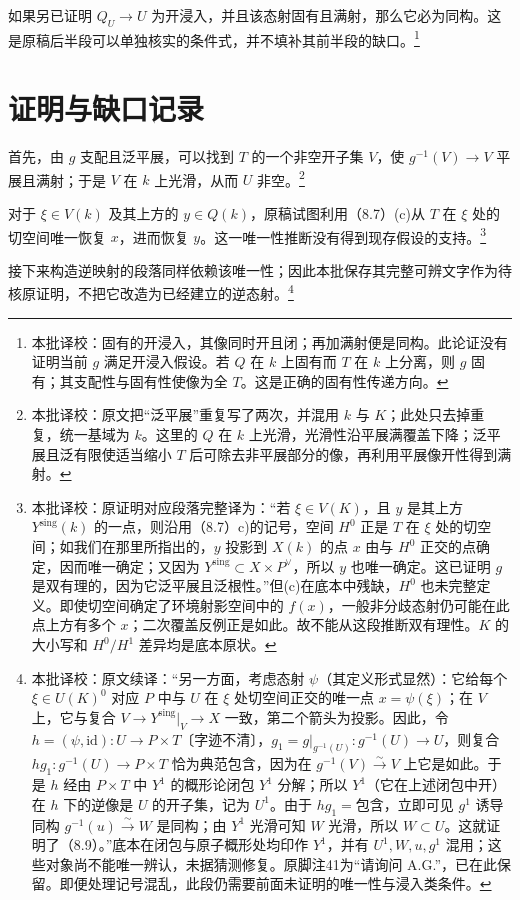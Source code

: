 \documentclass{ctexbook}
\newcommand{\corr}[1]{\footnote{本批译校：#1}}
\newcommand{\Ys}{Y^{\mathrm{sing}}}
\begin{document}
如果另已证明 $Q_U\to U$ 为开浸入，并且该态射固有且满射，那么它必为同构。这是原稿后半段可以单独核实的条件式，并不填补其前半段的缺口。\corr{固有的开浸入，其像同时开且闭；再加满射便是同构。此论证没有证明当前 $g$ 满足开浸入假设。若 $Q$ 在 $k$ 上固有而 $T$ 在 $k$ 上分离，则 $g$ 固有；其支配性与固有性使像为全 $T$。这是正确的固有性传递方向。}

\section*{证明与缺口记录}
首先，由 $g$ 支配且泛平展，可以找到 $T$ 的一个非空开子集 $V$，使 $g^{-1}(V)\to V$ 平展且满射；于是 $V$ 在 $k$ 上光滑，从而 $U$ 非空。\corr{原文把“泛平展”重复写了两次，并混用 $k$ 与 $K$；此处只去掉重复，统一基域为 $k$。这里的 $Q$ 在 $k$ 上光滑，光滑性沿平展满覆盖下降；泛平展且泛有限使适当缩小 $T$ 后可除去非平展部分的像，再利用平展像开性得到满射。}

对于 $\xi\in V(k)$ 及其上方的 $y\in Q(k)$，原稿试图利用（8.7）(c)从 $T$ 在 $\xi$ 处的切空间唯一恢复 $x$，进而恢复 $y$。这一唯一性推断没有得到现存假设的支持。\corr{原证明对应段落完整译为：“若 $\xi\in V(K)$，且 $y$ 是其上方 $\Ys(k)$ 的一点，则沿用（8.7）c)的记号，空间 $H^0$ 正是 $T$ 在 $\xi$ 处的切空间；如我们在那里所指出的，$y$ 投影到 $X(k)$ 的点 $x$ 由与 $H^0$ 正交的点确定，因而唯一确定；又因为 $\Ys\subset X\times P^\vee$，所以 $y$ 也唯一确定。这已证明 $g$ 是双有理的，因为它泛平展且泛根性。”但(c)在底本中残缺，$H^0$ 也未完整定义。即使切空间确定了环境射影空间中的 $f(x)$，一般非分歧态射仍可能在此点上方有多个 $x$；二次覆盖反例正是如此。故不能从这段推断双有理性。$K$ 的大小写和 $H^0/H^1$ 差异均是底本原状。}

接下来构造逆映射的段落同样依赖该唯一性；因此本批保存其完整可辨文字作为待核原证明，不把它改造为已经建立的逆态射。\corr{原文续译：“另一方面，考虑态射 $\psi$（其定义形式显然）：它给每个 $\xi\in U(K)^0$ 对应 $P$ 中与 $U$ 在 $\xi$ 处切空间正交的唯一点 $x=\psi(\xi)$；在 $V$ 上，它与复合 $V\to\Ys|_V\to X$ 一致，第二个箭头为投影。因此，令 $h=(\psi,\mathrm{id}):U\to P\times T$〔字迹不清〕，$g_1=g|_{g^{-1}(U)}:g^{-1}(U)\to U$，则复合 $hg_1:g^{-1}(U)\to P\times T$ 恰为典范包含，因为在 $g^{-1}(V)\xrightarrow{\sim}V$ 上它是如此。于是 $h$ 经由 $P\times T$ 中 $Y^1$ 的概形论闭包 $Y^1$ 分解；所以 $Y^1$（它在上述闭包中开）在 $h$ 下的逆像是 $U$ 的开子集，记为 $U^1$。由于 $hg_1=\text{包含}$，立即可见 $g^1$ 诱导同构 $g^{-1}(u)\xrightarrow{\sim}W$ 是同构；由 $Y^1$ 光滑可知 $W$ 光滑，所以 $W\subset U$。这就证明了（8.9）。”底本在闭包与原子概形处均印作 $Y^1$，并有 $U^1,W,u,g^1$ 混用；这些对象尚不能唯一辨认，未据猜测修复。原脚注41为“请询问 A.G.”，已在此保留。即便处理记号混乱，此段仍需要前面未证明的唯一性与浸入类条件。}
\end{document}
